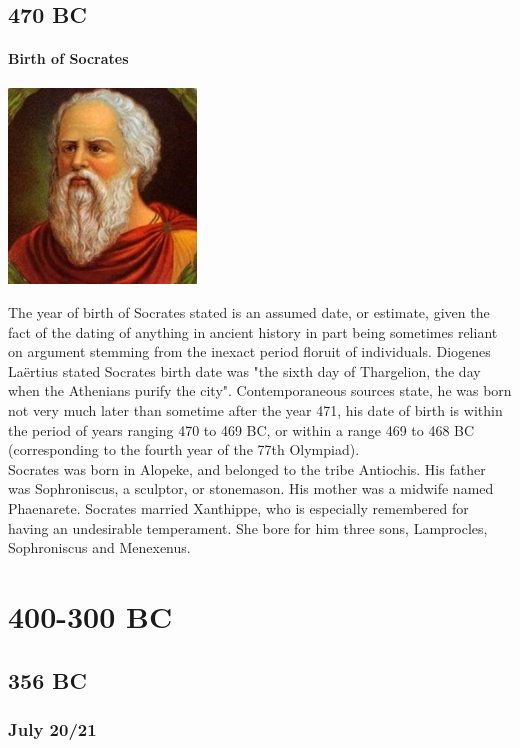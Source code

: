 \documentclass[11pt]{report}
\begin{document}
\chapter{470 BC}
\subsection{Birth of Socrates}
\vspace{2mm}\begin{center}\includegraphics[width=5cm]{./img/socrates.jpg}\end{center}
The year of birth of Socrates stated is an assumed date, or estimate, given the fact of the dating of anything in ancient history in part being sometimes reliant on argument stemming from the inexact period floruit of individuals. Diogenes Laërtius stated Socrates birth date was "the sixth day of Thargelion, the day when the Athenians purify the city". Contemporaneous sources state, he was born not very much later than sometime after the year 471, his date of birth is within the period of years ranging 470 to 469 BC, or within a range 469 to 468 BC (corresponding to the fourth year of the 77th Olympiad).\\
Socrates was born in Alopeke, and belonged to the tribe Antiochis. His father was Sophroniscus, a sculptor, or stonemason. His mother was a midwife named Phaenarete. Socrates married Xanthippe, who is especially remembered for having an undesirable temperament. She bore for him three sons, Lamprocles, Sophroniscus and Menexenus.


\part{400-300 BC}
\chapter{356 BC}
\section{July 20/21}
\end{document}
